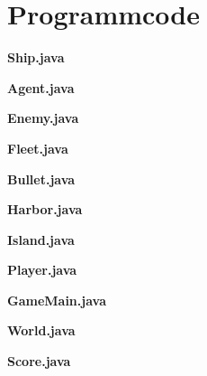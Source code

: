 \documentclass{article}
\begin{document}
\section{Programmcode}
\textbf{Ship.java}

\newpage
\textbf{Agent.java}

\newpage
\textbf{Enemy.java}

\newpage
\textbf{Fleet.java}

\newpage
\textbf{Bullet.java}

\newpage
\textbf{Harbor.java}

\newpage
\textbf{Island.java}

\newpage
\textbf{Player.java}

\newpage
\textbf{GameMain.java}

\newpage
\textbf{World.java}

\newpage
\textbf{Score.java}

\end{document}
